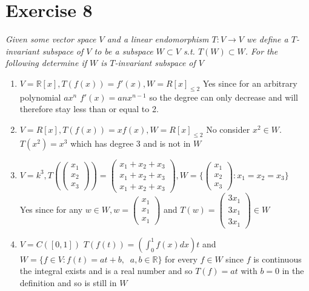 \documentclass{article}
\begin{document}
    \section{Exercise 8}
    \emph{
        Given some vector space $V$ and a linear endomorphism $T: V \rightarrow V$ 
        we define a $T$-invariant subspace of $V$ to be a subspace $W \subset V$ s.t.
        $T(W) \subset W$. For the following determine if $W$ is $T$-invariant subspace of $V$
    }
    \begin{enumerate}
        \item $V = \mathbb{R}[x], T(f(x)) = f'(x), W = R[x]_{\le 2}$
            Yes since for an arbitrary polynomial $ax^{n}$ $f'(x) = anx^{n-1}$
            so the degree can only decrease and will therefore stay less than or equal to 2.
        \item $V = R[x], T(f(x)) = xf(x), W = R[x]_{\le 2}$
            No consider  $x^2 \in W$. $T(x^2) = x^{3}$ which has degree 3 and is not in $W$
        \item  $V = k^{3}, T( \begin{pmatrix} x_1\\x_2\\x_3 \end{pmatrix} ) = \begin{pmatrix} x_1+x_2+x_3\\x_1+x_2+x_3\\x_1+x_2+x_3 \end{pmatrix} ,
            W = \{\begin{pmatrix} x_1\\x_2\\x_3 \end{pmatrix} : x_1=x_2=x_3\}$\\
            Yes since for any $w \in W, w = \begin{pmatrix} x_1 \\ x_1 \\ x_1 \end{pmatrix} $ and 
            $T(w) = \begin{pmatrix} 3x_1 \\ 3x_1 \\ 3x_1 \end{pmatrix}  \in W$ 
        \item $V = C([0,1]) $ $T(f(t)) = (\int_{0}^{1}f(x)dx)t$ and $W = \{f \in V: f(t) = at+b, \;\; a,b \in \mathbb{R}\}$ 
            for every $f \in W$ since $f$ is continuous the integral exists and is a real number and so
            $T(f) = at$ with $b = 0$ in the definition and so is still in $W$

\end{enumerate}
\end{document}
